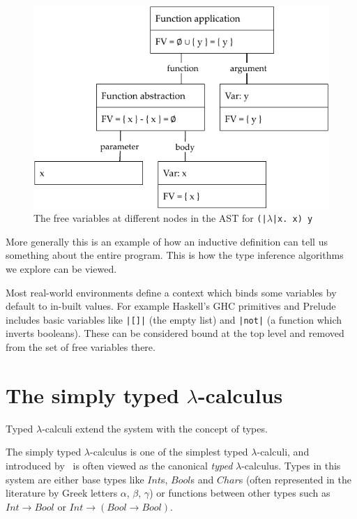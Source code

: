 \documentclass[a4paper,fleqn,oneside,12pt]{report}
\begin{document}
{\centering \begin{figure}[h!]
  \centering
  \includegraphics[width=0.8\linewidth]{images/ast_abs_id_y_fv.pdf}
  \caption{The free variables at different nodes in the AST for \texttt{(|$\lambda$|x. x) y}}
\end{figure} \par}

More generally this is an example of how an inductive definition can tell us something about the entire program. This is how the type inference algorithms we explore can be viewed.

Most real-world environments define a context which binds some variables by default to in-built values. For example Haskell’s GHC primitives and Prelude includes basic variables like \texttt{|[]|} (the empty list) and \texttt{|not|} (a function which inverts booleans). These can be considered bound at the top level and removed from the set of free variables there.

\section{The simply typed \texorpdfstring{$\lambda$-}{lambda }calculus}\label{id:h.w7vj0r89b86n}

Typed $\lambda$-calculi extend the system with the concept of types.

The simply typed $\lambda$-calculus is one of the simplest typed $\lambda$-calculi, and introduced by~\cite{ref11} is often viewed as the canonical \textit{typed} $\lambda$-calculus. Types in this system are either base types like $Int$s, $Bool$s and $Char$s (often represented in the literature by Greek letters $\alpha$, $\beta$, $\gamma$) or functions between other types such as $Int \rightarrow Bool$ or $Int \rightarrow (Bool \rightarrow Bool)$.
\end{document}
